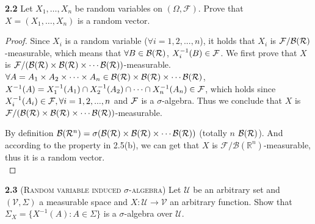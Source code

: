 
\noindent\textbf{2.2} 
Let $X_1,\dots,X_n$ be random variables on $(\Omega, \mathcal{F})$. Prove that $X=( X_1 ,\dots,X_n )$ is a random vector.
\begin{proof}
    Since $X_i$ is a random variable ($\forall i=1,2,...,n$), it holds that $X_i$ is $\mathcal{F}/\mathcal{B}(\mathcal{R})$-measurable, which means that $\forall B \in \mathcal{B}(\mathcal{R})$, $X_i^{-1}(B) \in \mathcal{F}$. 
    We first prove that $X$ is $\mathcal{F}/(\mathcal{B}(\mathcal{R}) \times \mathcal{B}(\mathcal{R})\times\cdots \mathcal{B}(\mathcal{R}) )$-measurable. $\forall A=A_1\times A_2 \times \cdots \times A_n  \in \mathcal{B}(\mathcal{R}) \times \mathcal{B}(\mathcal{R})\times\cdots \mathcal{B}(\mathcal{R})$, $X^{-1}(A) =X_1^{-1}(A_1) \cap X_2^{-1}(A_2) \cap \cdots \cap X_n^{-1}(A_n) \in \mathcal{F}$, which holds since $X_i^{-1}(A_i) \in \mathcal{F}, \forall i =1,2,...,n$ and $\mathcal{F}$ is a $\sigma$-algebra. Thus we conclude that $X$ is $\mathcal{F}/(\mathcal{B}(\mathcal{R}) \times \mathcal{B}(\mathcal{R})\times\cdots \mathcal{B}(\mathcal{R}) )$-measurable.

    By definition $\mathcal{B}(\mathcal{R}^n) = \sigma (\mathcal{B}(\mathcal{R}) \times \mathcal{B}(\mathcal{R})\times\cdots \mathcal{B}(\mathcal{R}))$ (totally $n$ $\mathcal{B}(\mathcal{R})$). And according to the property in 2.5(b), we can get that $X$ is $\mathcal{F}/\mathcal{B}(\mathbb{R}^n)$-measurable, thus it is a random vector.\\
\end{proof}


\noindent\textbf{2.3}
(\textsc{Random variable induced $\sigma$-algebra}) Let $\mathcal{U}$ be an arbitrary set and
$( \mathcal{V}, \Sigma)$ a measurable space and $X : \mathcal{U} \rightarrow \mathcal{V}$ an arbitrary function. Show that
$\Sigma_X = \{X ^{-1} (A) : A \in \Sigma\}$ is a $\sigma$-algebra over $\mathcal{U}$.

